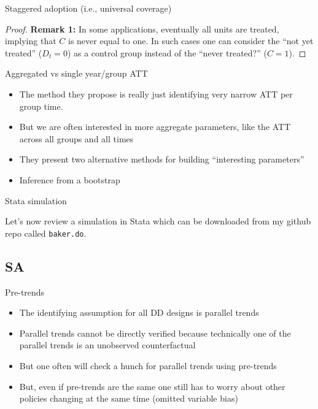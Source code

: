 \documentclass{beamer}
\begin{document}
\begin{frame}{Staggered adoption (i.e., universal coverage)}


\begin{proof}{\textbf{Remark 1:}}
In some applications, eventually all units are treated, implying that $C$ is never equal to one. In such cases one can consider the ``not yet treated'' ($D_t = 0$) as a control group instead of
the ``never treated?'' ($C = 1$).
\end{proof}

\end{frame}

\begin{frame}{Aggregated vs single year/group ATT}

\begin{itemize}
\item The method they propose is really just identifying very narrow ATT per group time.
\item But we are often interested in  more aggregate parameters, like the ATT across all groups and all times
\item They present two alternative methods for building ``interesting parameters'' 
\item Inference from a bootstrap
\end{itemize}


\end{frame}



\begin{frame}{Stata simulation}

Let's now review a simulation in Stata which can be downloaded from my github repo called \texttt{baker.do}.  

\bigskip

\end{frame}




\subsection{SA}


\begin{frame}{Pre-trends}

\begin{itemize}

	\item The identifying assumption for all DD designs is parallel trends
	\item Parallel trends cannot be directly verified because technically one of the parallel trends is an unobserved counterfactual
	\item But one often will check a hunch for parallel trends using pre-trends
	\item But, even if pre-trends are the same one still has to worry about other policies changing at the same time (omitted variable bias)

\end{itemize}

\end{frame}
\end{document}
